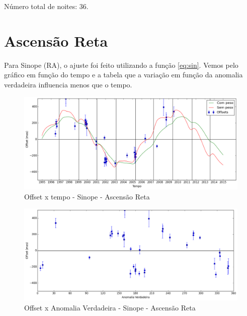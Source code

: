 \documentclass[11pt,a4paper]{report}
\begin{document}
\indent \indent Número total de noites: 36.

\section*{Ascensão Reta}

\indent \indent Para Sinope (RA), o ajuste foi feito utilizando a função \ref{eq:sin}. Vemos pelo gráfico em função do tempo e a tabela que a variação em função da anomalia verdadeira influencia menos que o tempo.\\

\begin{figure}[h]
\caption{Offset x tempo - Sinope - Ascensão Reta}
\includegraphics[scale=0.45]{Sinope/RA.png} 
\end{figure}

\begin{figure}[h]
\caption{Offset x Anomalia Verdadeira - Sinope - Ascensão Reta}
\includegraphics[scale=0.45]{Sinope/RA_anom.png}  
\end{figure}
\end{document}
